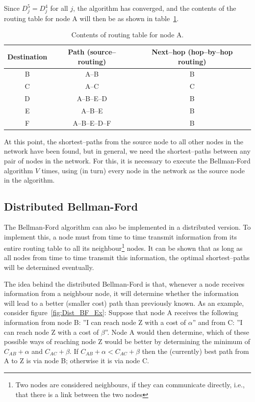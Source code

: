 \documentclass[a4paper]{article}
\newcommand{\ie}{i.e.,\xspace}
\begin{document}
Since $D^{5}_{j} = D^{4}_{j}$ for all $j$, the algorithm has
converged, and the contents of the routing table for node A will
then be as shown in table~\ref{tbl:RoutingTbl-A}.
\begin{table}[ht]
\centering
\begin{tabular}{|c|c|c|}\hline
%
Destination & Path (source--routing) & Next--hop (hop--by--hop
routing) \\ \hline
%
B & A--B & B \\ \hline
%
C & A--C & C \\ \hline
%
D & A--B--E--D & B \\ \hline
%
E & A--B--E & B \\ \hline
%
F & A--B--E--D--F & B \\ \hline
\end{tabular}
\caption{\label{tbl:RoutingTbl-A}Contents of routing table for
node A.}
\end{table}

At this point, the shortest--paths from the source node to all
other nodes in the network have been found, but in general, we
need the shortest--paths between any pair of nodes in the network.
For this, it is necessary to execute the Bellman-Ford algorithm
$V$ times, using (in turn) every node in the network as the
source node in the algorithm.

\subsection{Distributed Bellman-Ford}
\noindent{}The Bellman-Ford algorithm can also be implemented in
a distributed version. To implement this, a node must from time to
time transmit information from its entire routing table to all its
neighbour\footnote{Two nodes are considered neighbours, if they can
  communicate directly, \ie that there is a link between the two
  nodes} nodes. It can be shown that as long as all nodes from time to
time transmit this information, the optimal shortest--paths will be
determined eventually.

The idea behind the distributed Bellman-Ford is that, whenever a
node receives information from a neighbour node, it will determine
whether the information will lead to a better (smaller cost) path
than previously known. As an example, consider
figure~\ref{fig:Dist_BF_Ex}: Suppose that node A receives the
following information from node B: ''I can reach node Z with a cost
of $\alpha$'' and from C: ''I can reach node Z with a cost of
$\beta$''. Node A would then determine, which of these possible
ways of reaching node Z would be better by determining the minimum
of $C_{AB} + \alpha$ and $C_{AC} + \beta$. If $C_{AB} + \alpha <
C_{AC} + \beta$ then the (currently) best path from A to Z is via
node B; otherwise it is via node C.
\end{document}
